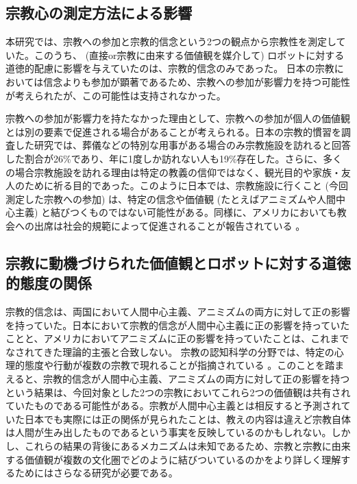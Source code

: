 \documentclass[a4j,12pt]{jreport}
\begin{document}
\subsection{宗教心の測定方法による影響}
本研究では、宗教への参加と宗教的信念という2つの観点から宗教性を測定していた。このうち、 (直接or宗教に由来する価値観を媒介して) ロボットに対する道徳的配慮に影響を与えていたのは、宗教的信念のみであった。
日本の宗教においては信念よりも参加が顕著であるため\cite{kava}、宗教への参加が影響力を持つ可能性が考えられたが、この可能性は支持されなかった。


宗教への参加が影響力を持たなかった理由として、宗教への参加が個人の価値観とは別の要素で促進される場合があることが考えられる。日本の宗教的慣習を調査した研究\cite{kava}では、葬儀などの特別な用事がある場合のみ宗教施設を訪れると回答した割合が26\%であり、年に1度しか訪れない人も19\%存在した。さらに、多くの場合宗教施設を訪れる理由は特定の教義の信仰ではなく、観光目的や家族・友人のために祈る目的であった。このように日本では、宗教施設に行くこと (今回測定した宗教への参加) は、特定の信念や価値観 (たとえばアニミズムや人間中心主義) と結びつくものではない可能性がある。同様に、アメリカにおいても教会への出席は社会的規範によって促進されることが報告されている\cite{church} 。

\subsection{宗教に動機づけられた価値観とロボットに対する道徳的態度の関係}
宗教的信念は、両国において人間中心主義、アニミズムの両方に対して正の影響を持っていた。日本において宗教的信念が人間中心主義に正の影響を持っていたことと、アメリカにおいてアニミズムに正の影響を持っていたことは、これまでなされてきた理論的主張\cite{hosaka}と合致しない。
宗教の認知科学\cite{csr}の分野では、特定の心理的態度や行動が複数の宗教で現れることが指摘されている\cite{jong} 。このことを踏まえると、宗教的信念が人間中心主義、アニミズムの両方に対して正の影響を持つという結果は、今回対象とした2つの宗教においてこれら2つの価値観は共有されていたものである可能性がある。宗教が人間中心主義とは相反すると予測されていた日本でも実際には正の関係が見られたことは、教えの内容は違えど宗教自体は人間が生み出したものであるという事実を反映しているのかもしれない。しかし、これらの結果の背後にあるメカニズムは未知であるため、宗教と宗教に由来する価値観が複数の文化圏でどのように結びついているのかをより詳しく理解するためにはさらなる研究が必要である。
\end{document}
